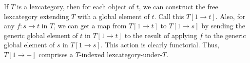 \documentclass[./main.tex]{subfiles}
\begin{document}
\begin{definition}
If $T$ is a lexcategory, then for each object of $t$, we can construct the free lexcategory extending $T$ with a global element of $t$. Call this $T[1 \to t]$. Also, for any $f : s \to t$ in $T$, we can get a map from $T[1 \to t]$ to $T[1 \to s]$ by sending the generic global element of $t$ in $T[1 \to t]$ to the result of applying $f$ to the generic global element of $s$ in $T[1 \to s]$. This action is clearly functorial. Thus, $T[1 \to -]$ comprises a $T$-indexed lexcategory-under-$T$. 
\end{definition}
\end{document}
